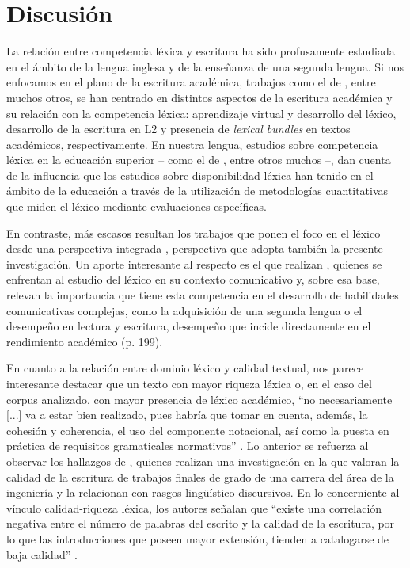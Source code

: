 \documentclass{textolivre-html}
\begin{document}
\section{Discusión}\label{sec-discusion}
La relación entre competencia léxica y escritura ha sido profusamente estudiada
en el ámbito de la lengua inglesa y de la enseñanza de una segunda lengua. Si
nos enfocamos en el plano de la escritura académica, trabajos como el de \textcite{PrezCaado2010,Yoon2018,Pan2019}, 
entre muchos otros, se han centrado en
distintos aspectos de la escritura académica y su relación con la competencia
léxica: aprendizaje virtual y desarrollo del léxico, desarrollo de la escritura
en L2 y presencia de \textit{lexical bundles} en textos académicos, respectivamente. En
nuestra lengua, estudios sobre competencia léxica en la educación superior –
como el de \textcite{RiffoOcares2014,munoz2015,GonzaloZapico2016,Zapico2017,vega2018,Trigo2019},
entre otros muchos –, dan cuenta de la influencia que los estudios sobre
disponibilidad léxica han tenido en el ámbito de la educación a través de
la utilización de metodologías cuantitativas que miden el léxico mediante
evaluaciones específicas.

En contraste, más escasos resultan los trabajos que ponen el foco en el
léxico desde una perspectiva integrada \cite[p. e.]{madrigal2016,gracia2019},
perspectiva que adopta también la presente investigación. Un aporte
interesante al respecto es el que realizan \textcite{aravena}, quienes se
enfrentan al estudio del léxico en su contexto comunicativo y, sobre esa base,
relevan la importancia que tiene esta competencia en el desarrollo de
habilidades comunicativas complejas, como la adquisición de una segunda lengua
o el desempeño en lectura y escritura, desempeño que incide directamente en el
rendimiento académico (p. 199). 

En cuanto a la relación entre dominio léxico y calidad textual, nos
parece interesante destacar que un texto con mayor riqueza léxica o, en el caso
del corpus analizado, con mayor presencia de léxico académico, “no
necesariamente [...] va a estar bien realizado, pues habría que tomar en cuenta,
además, la cohesión y coherencia, el uso del componente notacional, así como la
puesta en práctica de requisitos gramaticales normativos” \cite[p. 145]{madrigal2016}.
Lo anterior se refuerza al observar los hallazgos de
\textcite{LilloFuentes2020}, quienes realizan una investigación en la
que valoran la calidad de la escritura de trabajos finales de grado de una
carrera del área de la ingeniería y la relacionan con rasgos
lingüístico-discursivos. En lo concerniente al vínculo calidad-riqueza léxica,
los autores señalan que “existe una correlación negativa entre el número de
palabras del escrito y la calidad de la escritura, por lo que las
introducciones que poseen mayor extensión, tienden a catalogarse de baja
calidad” \cite[p. 11]{LilloFuentes2020}.
\end{document}
